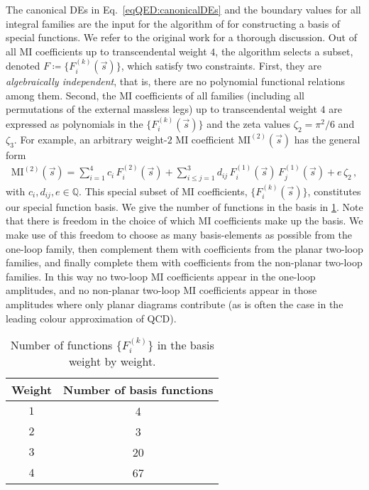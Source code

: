 \documentclass[main.tex]{subfiles}
\begin{document}
The canonical DEs in Eq.~\ref{eqQED:canonicalDEs} and the boundary values for all integral families are the input for the algorithm of  for constructing a basis of special functions. We refer to the original work for a thorough discussion. 
Out of all MI coefficients up to transcendental weight $4$, the algorithm selects a subset, denoted $F \coloneqq \{F^{(k)}_i(\vec{s})\}$, which satisfy two constraints. 
First, they are \emph{algebraically independent}, that is, there are no polynomial functional relations among them. Second, the MI coefficients of all families (including all permutations of the external massless legs) up to transcendental weight $4$ are expressed as polynomials in the $\{F^{(k)}_i(\vec{s})\}$ and the zeta values $\zeta_2 = \pi^2/6$ and $\zeta_3$. For example, an arbitrary weight-$2$ MI coefficient $\text{MI}^{(2)}(\vec{s})$ has the general form
\begin{align}
\text{MI}^{(2)}(\vec{s}) = \sum_{i=1}^{4} c_i \, F_i^{(2)}(\vec{s}) + \sum_{i \le j =1}^{3} d_{ij} \, F_i^{(1)}(\vec{s}) \,  F_j^{(1)}(\vec{s}) + e \, \zeta_2 \,,
\end{align}
with $c_i, d_{ij}, e \in \mathbb{Q}$. This special subset of MI coefficients, $\{F^{(k)}_i(\vec{s})\}$, constitutes our special function basis. 
We give the number of functions in the basis in \cref{tab:func_basis}. Note that there is freedom in the choice of which MI coefficients make up the basis. We make use of this freedom to choose as many basis-elements as possible from the one-loop family, then complement them with coefficients from the planar two-loop families, and finally complete them with coefficients from the non-planar two-loop families. In this way no two-loop MI coefficients appear in the one-loop amplitudes, and no non-planar two-loop MI coefficients appear in those amplitudes where only planar diagrams contribute (as is often the case in the leading colour approximation of QCD).

\begin{table}
    \centering
    \begin{tabular}{cc}
        \hline
        Weight & Number of basis functions \\
        \hline
        $1$ & 4 \\
        $2$ & 3 \\
        $3$ & 20 \\
        $4$ & 67 \\
        \hline
    \end{tabular}
    \caption{Number of functions $\{F^{(k)}_i\}$ in the basis weight by weight.}
    \label{tab:func_basis}
\end{table}
\end{document}
